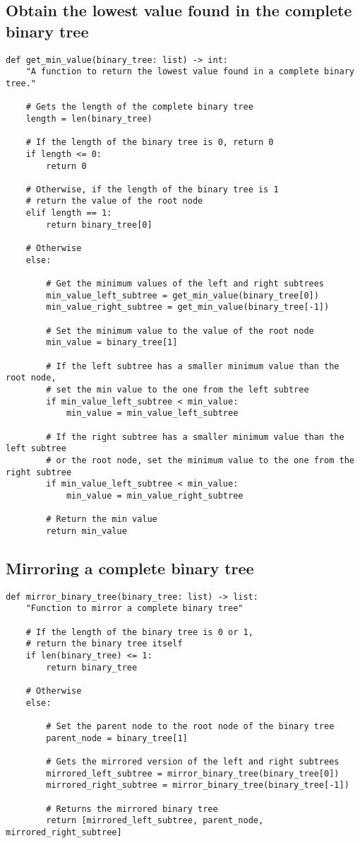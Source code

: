 \documentclass[11pt]{article}
\begin{document}
\subsection{Obtain the lowest value found in the complete binary tree}
\label{sec:org5e29151}
\begin{verbatim}
def get_min_value(binary_tree: list) -> int:
    "A function to return the lowest value found in a complete binary tree."

    # Gets the length of the complete binary tree
    length = len(binary_tree)

    # If the length of the binary tree is 0, return 0
    if length <= 0:
        return 0

    # Otherwise, if the length of the binary tree is 1
    # return the value of the root node
    elif length == 1:
        return binary_tree[0]

    # Otherwise
    else:

        # Get the minimum values of the left and right subtrees
        min_value_left_subtree = get_min_value(binary_tree[0])
        min_value_right_subtree = get_min_value(binary_tree[-1])

        # Set the minimum value to the value of the root node
        min_value = binary_tree[1]

        # If the left subtree has a smaller minimum value than the root node,
        # set the min value to the one from the left subtree
        if min_value_left_subtree < min_value:
            min_value = min_value_left_subtree

        # If the right subtree has a smaller minimum value than the left subtree
        # or the root node, set the minimum value to the one from the right subtree
        if min_value_left_subtree < min_value:
            min_value = min_value_right_subtree

        # Return the min value
        return min_value
\end{verbatim}

\subsection{Mirroring a complete binary tree}
\label{sec:orgf2c0d48}
\begin{verbatim}
def mirror_binary_tree(binary_tree: list) -> list:
    "Function to mirror a complete binary tree"

    # If the length of the binary tree is 0 or 1,
    # return the binary tree itself
    if len(binary_tree) <= 1:
        return binary_tree

    # Otherwise
    else:

        # Set the parent node to the root node of the binary tree
        parent_node = binary_tree[1]

        # Gets the mirrored version of the left and right subtrees
        mirrored_left_subtree = mirror_binary_tree(binary_tree[0])
        mirrored_right_subtree = mirror_binary_tree(binary_tree[-1])

        # Returns the mirrored binary tree
        return [mirrored_left_subtree, parent_node, mirrored_right_subtree]
\end{verbatim}
\end{document}
